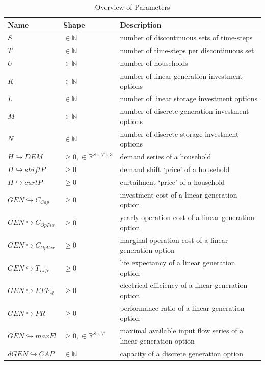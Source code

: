 \documentclass[
	11pt,								%
	DIV10,								%
	a4paper,         					%
	oneside,							%
	headheight=20pt,					%
	footheight=20pt,					%
    parskip=full,						%
    listof=totoc,						%
	bibliography=totoc,					%
	index=totoc,						%
]{scrartcl}
\begin{document}
\begin{table}[H]
	\centering
	\caption{Overview of Parameters}
	\begin{tabular}{llp{8cm}}
		\hline
		\textbf{Name}			& \textbf{Shape}  & \textbf{Description}	\\ 
		\hline
		$S$ & $\in \mathbb{N}$ & number of discontinuous sets of time-steps \\
		$T$ & $\in \mathbb{N}$ & number of time-steps per discontinuous set \\
		$U$ & $\in \mathbb{N}$ & number of households \\
		$K$ & $\in \mathbb{N}$ & number of linear generation investment options \\
		$L$ & $\in \mathbb{N}$ & number of linear storage investment options \\
		$M$ & $\in \mathbb{N}$ & number of discrete generation investment options \\
		$N$ & $\in \mathbb{N}$ & number of discrete storage investment options \\
		$H \hookrightarrow DEM$ & $\geq 0, \in \mathbb{R}^{S\times T \times 3}$ & demand series of a household \\
		$H \hookrightarrow shiftP$ & $\geq 0$ & demand shift `price' of a household \\
		$H \hookrightarrow curtP$ & $\geq 0$ & curtailment `price' of a household \\
		$GEN \hookrightarrow C_{Cap}$ & $\geq 0$ & investment cost of a linear generation option \\
		$GEN \hookrightarrow C_{OpFix}$ & $\geq 0$ & yearly operation cost of a linear generation option \\
		$GEN \hookrightarrow C_{OpVar}$ & $\geq 0$ & marginal operation cost of a linear generation option\\
		$GEN \hookrightarrow T_{Life}$ & $\geq 0$ & life expectancy of a linear generation option \\
		$GEN \hookrightarrow EFF_{el}$ & $\geq 0$ & electrical efficiency of a linear generation option \\
		$GEN \hookrightarrow PR$ & $\geq 0$ & performance ratio of a linear generation option \\
		$GEN \hookrightarrow maxFl$ & $\geq 0, \in \mathbb{R}^{S\times T}$ & maximal available input flow series of a linear generation option\\
		$dGEN \hookrightarrow CAP$ & $\in \mathbb{N}$ & capacity of a discrete generation option \\

\end{tabular}
\end{table}
\end{document}
